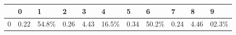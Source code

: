 \begin{tabular}{lllllllllll}
\toprule
{} &     0 &      1 &     2 &     3 &      4 &     5 &      6 &     7 &     8 &      9 \\
\midrule
0 &  0.22 &  54.8\% &  0.26 &  4.43 &  16.5\% &  0.34 &  50.2\% &  0.24 &  4.46 &  02.3\% \\
\bottomrule
\end{tabular}
